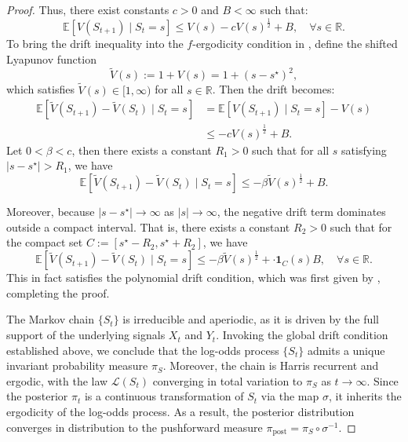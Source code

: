 \documentclass[12pt]{article}
\begin{document}
\begin{proof}
    Thus, there exist constants $c>0$ and $B<\infty$ such that:
    \[
    \mathbb{E}[V(S_{t+1}) \mid S_t=s] \le V(s) - c V(s)^{\frac{1}{2}} + B, \quad \forall s \in \mathbb{R}.
    \]
    To bring the drift inequality into the $f$-ergodicity condition in \citep[Ch.~14]{meynMarkovChainsStochastic1993}, define the shifted Lyapunov function
    \[
    \widetilde{V}(s) := 1 + V(s) = 1 + (s - s^\star)^2,
    \]
    which satisfies \( \widetilde{V}(s) \in [1, \infty) \) for all \( s \in \mathbb{R} \). Then the drift becomes:
    \[
    \begin{aligned}
    \mathbb{E}[\widetilde{V}(S_{t+1}) - \widetilde{V}(S_t) \mid S_t = s]
    &= \mathbb{E}[V(S_{t+1}) \mid S_t = s] - V(s) \\
    &\leq - c V(s)^{\frac{1}{2}} + B.
    \end{aligned}
    \]
    Let \( 0 < \beta < c \), then there exists a constant \( R_1 > 0 \) such that for all \( s \) satisfying \( |s - s^\star| > R_1 \), we have 
    \[
    \mathbb{E}[\widetilde{V}(S_{t+1}) - \widetilde{V}(S_t) \mid S_t = s] \leq -\beta \widetilde{V}(s)^{\frac{1}{2}} + B.
    \]
    
    Moreover, because \( |s - s^\star| \to \infty \) as \( |s| \to \infty \), the negative drift term dominates outside a compact interval. That is, there exists a constant \( R_2 > 0 \) such that for the compact set \( C := [s^\star - R_2, s^\star + R_2] \), we have
    \[
    \mathbb{E}[\widetilde{V}(S_{t+1}) - \widetilde{V}(S_t) \mid S_t = s] \leq -\beta \widetilde{V}(s)^{\frac{1}{2}} + \cdot \mathbf{1}_C(s) B, \quad \forall s \in \mathbb{R}.
    \]
    This in fact satisfies the polynomial drift condition, which was first given by \citet{jarner2002polynomial}, completing the proof.
    
The Markov chain \(\{ S_t \}\) is irreducible and aperiodic, as it is driven by the full support of the underlying signals \(X_t\) and \(Y_t\). Invoking the global drift condition established above, we conclude that the log-odds process \(\{ S_t \}\) admits a unique invariant probability measure \(\pi_S\). Moreover, the chain is Harris recurrent and ergodic, with the law \(\mathcal{L}(S_t)\) converging in total variation to \(\pi_S\) as \(t \to \infty\). Since the posterior \(\pi_t\) is a continuous transformation of \(S_t\) via the map \(\sigma\), it inherits the ergodicity of the log-odds process. As a result, the posterior distribution converges in distribution to the pushforward measure \(\pi_{\text{post}} = \pi_S \circ \sigma^{-1}\).

\end{proof}
\end{document}
